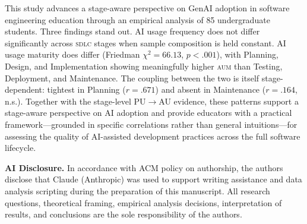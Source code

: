 \documentclass[sigconf,anonymous]{acmart}
\newcommand{\AUM}{\textsc{aum}\xspace}
\newcommand{\SDLC}{\textsc{sdlc}\xspace}
\newcommand{\GenAI}{GenAI\xspace}
\begin{document}
This study advances a stage-aware perspective on \GenAI adoption in
software engineering education through an empirical analysis of 85
undergraduate students. Three findings stand out. AI usage frequency
does not differ significantly across \SDLC stages when sample
composition is held constant. AI usage maturity does differ
(Friedman $\chi^2 = 66.13$, $p < .001$), with Planning, Design, and
Implementation showing meaningfully higher \AUM than Testing,
Deployment, and Maintenance. The coupling between the two is itself
stage-dependent: tightest in Planning ($r = .671$) and absent in
Maintenance ($r = .164$, n.s.). Together with the stage-level
PU$\rightarrow$AU evidence, these patterns support a stage-aware
perspective on AI adoption and provide educators with a practical
framework---grounded in specific correlations rather than general
intuitions---for assessing the quality of AI-assisted development
practices across the full software lifecycle.

\begin{acks}

\medskip\noindent\textbf{AI Disclosure.} In accordance with ACM policy on
authorship, the authors disclose that Claude (Anthropic) was used to
support writing assistance and data analysis scripting during the
preparation of this manuscript. All research questions, theoretical
framing, empirical analysis decisions, interpretation of results, and
conclusions are the sole responsibility of the authors.
\end{acks}

\newpage


\end{document}
